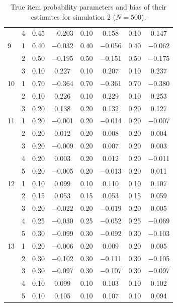 \begin{table}[H]
\begin{tabular}{llcccccc}
   & 4 & 0.45 & $-$0.203 & 0.10 & 0.158 & 0.10 & 0.147 \\ 
  9 & 1 & 0.40 & $-$0.032 & 0.40 & $-$0.056 & 0.40 & $-$0.062 \\ 
   & 2 & 0.50 & $-$0.195 & 0.50 & $-$0.151 & 0.50 & $-$0.175 \\ 
   & 3 & 0.10 & 0.227 & 0.10 & 0.207 & 0.10 & 0.237 \\ 
  10 & 1 & 0.70 & $-$0.364 & 0.70 & $-$0.361 & 0.70 & $-$0.380 \\ 
   & 2 & 0.10 & 0.226 & 0.10 & 0.229 & 0.10 & 0.253 \\ 
   & 3 & 0.20 & 0.138 & 0.20 & 0.132 & 0.20 & 0.127 \\ 
  11 & 1 & 0.20 & $-$0.001 & 0.20 & $-$0.014 & 0.20 & $-$0.007 \\ 
   & 2 & 0.20 & 0.012 & 0.20 & 0.008 & 0.20 & 0.004 \\ 
   & 3 & 0.20 & $-$0.009 & 0.20 & 0.007 & 0.20 & 0.003 \\ 
   & 4 & 0.20 & 0.003 & 0.20 & 0.012 & 0.20 & $-$0.011 \\ 
   & 5 & 0.20 & $-$0.005 & 0.20 & $-$0.013 & 0.20 & 0.011 \\ 
  12 & 1 & 0.10 & 0.099 & 0.10 & 0.110 & 0.10 & 0.107 \\ 
   & 2 & 0.15 & 0.053 & 0.15 & 0.053 & 0.15 & 0.059 \\ 
   & 3 & 0.20 & $-$0.022 & 0.20 & $-$0.019 & 0.20 & 0.005 \\ 
   & 4 & 0.25 & $-$0.030 & 0.25 & $-$0.052 & 0.25 & $-$0.069 \\ 
   & 5 & 0.30 & $-$0.099 & 0.30 & $-$0.092 & 0.30 & $-$0.103 \\ 
  13 & 1 & 0.20 & $-$0.006 & 0.20 & 0.009 & 0.20 & 0.005 \\ 
   & 2 & 0.30 & $-$0.102 & 0.30 & $-$0.111 & 0.30 & $-$0.105 \\ 
   & 3 & 0.30 & $-$0.097 & 0.30 & $-$0.107 & 0.30 & $-$0.097 \\ 
   & 4 & 0.10 & 0.099 & 0.10 & 0.103 & 0.10 & 0.102 \\ 
   & 5 & 0.10 & 0.105 & 0.10 & 0.107 & 0.10 & 0.094 \\ 
   \bottomrule
\end{tabular}
\caption{True item probability parameters and bias of their estimates for simulation 2 ($N = 500$).} 
\label{table:sim2_item_prob_bias_N500}
\end{table}
